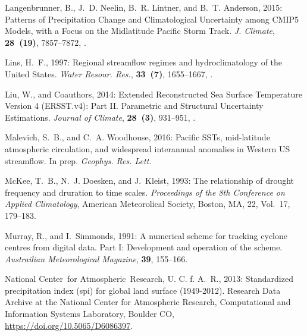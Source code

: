 \documentclass[final, double]{ua-thesis}
\begin{document}
\begin{thebibliography}{}
Langenbrunner, B., J.~D. Neelin, B.~R. Lintner, and B.~T. Anderson, 2015:
  Patterns of {Precipitation} {Change} and {Climatological} {Uncertainty} among
  {CMIP}5 {Models}, with a {Focus} on the {Midlatitude} {Pacific} {Storm}
  {Track}. \textit{J. Climate}, \textbf{28~(19)}, 7857--7872,
  .

Lins, H.~F., 1997: Regional streamflow regimes and hydroclimatology of the
  {United} {States}. \textit{Water Resour. Res.}, \textbf{33~(7)}, 1655--1667,
  .

Liu, W., and Coauthors, 2014: Extended {Reconstructed} {Sea} {Surface}
  {Temperature} {Version} 4 ({ERSST}.v4): {Part} {II}. {Parametric} and
  {Structural} {Uncertainty} {Estimations}. \textit{Journal of Climate},
  \textbf{28~(3)}, 931--951, .

Malevich, S.~B., and C.~A. Woodhouse, 2016: Pacific {SSTs}, mid-latitude
  atmospheric circulation, and widespread interannual anomalies in {Western}
  {US} streamflow. In prep. \textit{Geophys. Res. Lett.}

McKee, T.~B., N.~J. Doesken, and J.~Kleist, 1993: The relationship of drought
  frequency and druration to time scales. \textit{Proceedings of the 8th
  {Conference} on {Applied} {Climatology}}, American Meteorolical Society,
  Boston, MA, 22, Vol.~17, 179--183.

Murray, R., and I.~Simmonds, 1991: A numerical scheme for tracking cyclone
  centres from digital data. {Part} {I}: {Development} and operation of the
  scheme. \textit{Austrailian Meteorological Magazine}, \textbf{39}, 155--166.

National Center~for Atmospheric~Research, U. C. f. A.~R., 2013: Standardized
  precipitation index (spi) for global land surface (1949-2012). Research Data
  Archive at the National Center for Atmospheric Research, Computational and
  Information Systems Laboratory, Boulder CO,
  \urlprefix\url{https://doi.org/10.5065/D6086397}.


\end{thebibliography}
\end{document}
